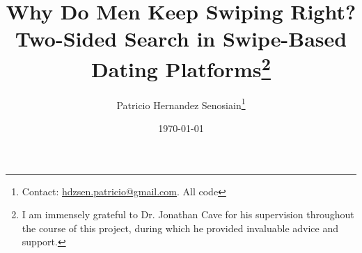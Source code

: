 \begin{titlepage}
    \title{Why Do Men Keep Swiping Right? Two-Sided Search in Swipe-Based Dating Platforms\thanks{I am immensely grateful to Dr. Jonathan Cave for his supervision throughout the course of this project, during which he provided invaluable advice and support.}}
    \author{Patricio Hernandez Senosiain\thanks{Contact: \href{mailto:hdzsen.patricio@gmail.com}{hdzsen.patricio@gmail.com}. All code }}
    \date{\today}
    \maketitle
     
    \setcounter{page}{0}
    \thispagestyle{empty}
\end{titlepage}